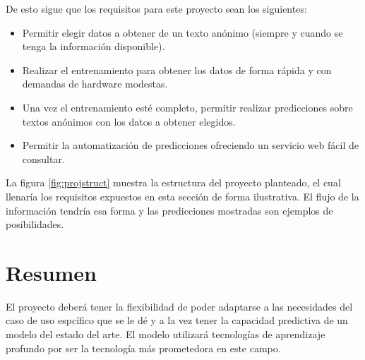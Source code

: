 De esto sigue que los requisitos para este proyecto sean los siguientes:

\begin{itemize}
\item Permitir elegir datos a obtener de un texto anónimo (siempre y cuando se tenga la información disponible).
\item Realizar el entrenamiento para obtener los datos de forma rápida y con demandas de hardware modestas.
\item Una vez el entrenamiento esté completo, permitir realizar predicciones sobre textos anónimos con los datos a obtener elegidos.
\item Permitir la automatización de predicciones ofreciendo un servicio web fácil de consultar.
\end{itemize}

La figura \ref{fig:projstruct} muestra la estructura del proyecto planteado, el cual llenaría los requisitos expuestos en esta sección de forma ilustrativa. El flujo de la información tendría esa forma y las predicciones mostradas son ejemplos de posibilidades.

\section{Resumen}

El proyecto deberá tener la flexibilidad de poder adaptarse a las necesidades del caso de uso espcífico que se le dé y a la vez tener la capacidad predictiva de un modelo del estado del arte. El modelo utilizará tecnologías de aprendizaje profundo por ser la tecnología más prometedora en este campo.





